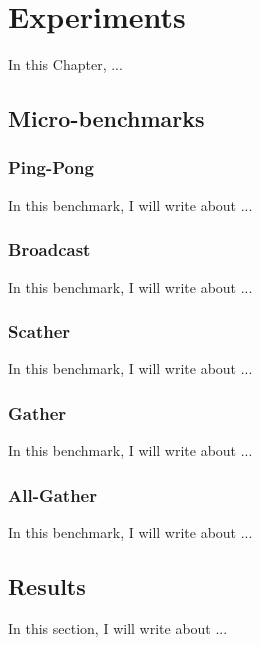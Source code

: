 \chapter{Experiments}
\label{ch.experiments}

    In this Chapter, ...

    \section{Micro-benchmarks}

        \subsection*{Ping-Pong}

            In this benchmark, I will write about ...

        \subsection*{Broadcast}

            In this benchmark, I will write about ...

        \subsection*{Scather}

            In this benchmark, I will write about ...

        \subsection*{Gather}

            In this benchmark, I will write about ...

        \subsection*{All-Gather}

            In this benchmark, I will write about ...

    \section{Results}

        In this section, I will write about ...